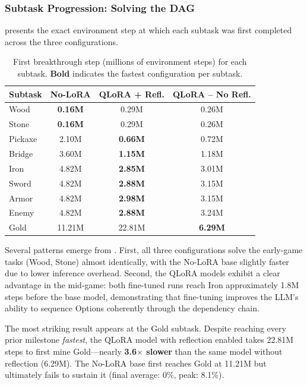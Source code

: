 \subsubsection{Subtask Progression: Solving the DAG}

 presents the exact environment step at which each subtask was first completed across the three configurations.

\begin{table}[H]
\centering
\caption{First breakthrough step (millions of environment steps) for each subtask. \textbf{Bold} indicates the fastest configuration per subtask.}
\label{tab:hrl_breakthrough}
\begin{tabular}{lccc}
\hline
\textbf{Subtask} & \textbf{No-LoRA} & \textbf{QLoRA + Refl.} & \textbf{QLoRA -- No Refl.} \\
\hline
Wood       & \textbf{0.16M} & 0.29M & 0.26M \\
Stone      & \textbf{0.16M} & 0.29M & 0.26M \\
Pickaxe    & 2.10M & \textbf{0.66M} & 0.72M \\
Bridge     & 3.60M & \textbf{1.15M} & 1.18M \\
Iron       & 4.82M & \textbf{2.85M} & 3.01M \\
Sword      & 4.82M & \textbf{2.88M} & 3.15M \\
Armor      & 4.82M & \textbf{2.98M} & 3.15M \\
Enemy      & 4.82M & \textbf{2.88M} & 3.24M \\
Gold       & 11.21M & 22.81M & \textbf{6.29M} \\
\hline
\end{tabular}
\end{table}

Several patterns emerge from . First, all three configurations solve the early-game tasks (Wood, Stone) almost identically, with the No-LoRA base slightly faster due to lower inference overhead. Second, the QLoRA models exhibit a clear advantage in the mid-game: both fine-tuned runs reach Iron approximately 1.8M steps before the base model, demonstrating that fine-tuning improves the LLM's ability to sequence Options coherently through the dependency chain.

The most striking result appears at the Gold subtask. Despite reaching every prior milestone \emph{fastest}, the QLoRA model with reflection enabled takes 22.81M steps to first mine Gold---nearly \textbf{3.6$\times$ slower} than the same model without reflection (6.29M). The No-LoRA base first reaches Gold at 11.21M but ultimately fails to sustain it (final average: 0\%, peak: 8.1\%).

